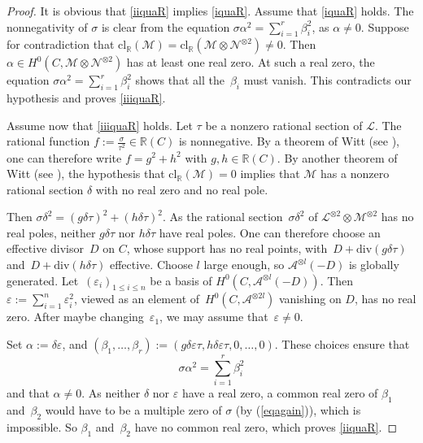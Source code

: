 \documentclass{amsart}
\theoremstyle{definition}
\theoremstyle{remark}
\numberwithin{equation}{section}
\newcommand{\cl}{\mathrm{cl}}
\newcommand{\ddiv}{\mathrm{div}}
\def\R{\mathbb R}
\def\cA{\mathcal{A}}
\def\cN{\mathcal{N}}
\def\cM{\mathcal{M}}
\def\cL{\mathcal{L}}
\def\cM{\mathcal{M}}
\begin{document}
\begin{proof}
It is obvious that \ref{iiquaR} implies \ref{iquaR}. Assume that \ref{iquaR} holds. The nonnegativity of $\sigma$ is clear from the equation $\sigma\alpha^2=\sum_{i=1}^r\beta_{i}^2$, as $\alpha\neq 0$. Suppose for contradiction that $\cl_{\R}(\cM)=\cl_{\R}(\cM\otimes\cN^{\otimes 2})\neq 0$. Then $\alpha\in H^0(C,\cM\otimes\cN^{\otimes 2})$ has at least one real zero. At such a real zero, the equation $\sigma\alpha^2=\sum_{i=1}^r\beta_{i}^2$ shows that all the~$\beta_i$ must vanish. This contradicts our hypothesis and proves \ref{iiiquaR}.

Assume now that \ref{iiiquaR} holds. Let $\tau$ be a nonzero rational section of $\cL$. The rational function ${f:=\frac{\sigma}{\tau^2}\in\R(C)}$ is nonnegative. By a theorem of Witt (see \cite[I~p.\,4]{Witt}), one can therefore write $f=g^2+h^2$ with $g,h\in\R(C)$. By another theorem of Witt (see \cite[III~p.\,4]{Witt}), the hypothesis that $\cl_{\R}(\cM)=0$ implies that $\cM$ has a nonzero rational section $\delta$ with no real zero and no real pole.

Then $\sigma\delta^2=(g\delta\tau)^2+(h\delta\tau)^2$.
As the rational section~$\sigma\delta^2$ of $\cL^{\otimes 2}\otimes \cM^{\otimes 2}$ has no real poles, neither $g\delta\tau$ nor $h\delta\tau$ have real poles. One can therefore choose an effective divisor~$D$ on $C$, whose support has no real points, with~${D+\ddiv(g\delta\tau)}$ and~${D+\ddiv(h\delta\tau)}$ effective. Choose $l$ large enough, so $\cA^{\otimes l}(-D)$ is globally generated. Let~$(\varepsilon_i)_{1\leq i\leq n}$ be a basis of $H^0(C,\cA^{\otimes l}(-D))$. Then $\varepsilon:=\sum_{i=1}^n\varepsilon_i^2$, viewed as an element of~$H^0(C,\cA^{\otimes 2l})$ vanishing on $D$, has no real zero. After maybe changing~$\varepsilon_1$, we may assume that~$\varepsilon\neq 0$.

 Set $\alpha:=\delta\varepsilon$, and $(\beta_1,\dots, \beta_r):=(g\delta\varepsilon\tau,h\delta\varepsilon\tau,0,\dots, 0)$. These choices ensure that
 \begin{equation}
 \label{eqagain}
 \sigma\alpha^2=\sum_{i=1}^r\beta_{i}^2
 \end{equation}
 and that $\alpha\neq 0$.
 As neither $\delta$ nor $\varepsilon$ have a real zero, a common real zero of $\beta_1$ and~$\beta_2$ would have to be a multiple zero of $\sigma$ (by (\ref{eqagain})), which is impossible. So $\beta_1$ and~$\beta_2$ have no common real zero, which proves \ref{iiquaR}.
\end{proof}
\end{document}

